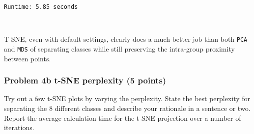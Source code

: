 \documentclass[11pt]{article}
\begin{document}
    \begin{Verbatim}[commandchars=\\\{\}]
Runtime: 5.85 seconds

    \end{Verbatim}

    \begin{center}
    \end{center}
    { \hspace*{\fill} \\}
    
    T-SNE, even with default settings, clearly does a much better job than
both \texttt{PCA} and \texttt{MDS} of separating classes while still
preserving the intra-group proximity between points.

    \subsubsection{Problem 4b t-SNE perplexity (5
points)}\label{problem-4b-t-sne-perplexity-5-points}

Try out a few t-SNE plots by varying the perplexity. State the best
perplexity for separating the 8 different classes and describe your
rationale in a sentence or two. Report the average calculation time for
the t-SNE projection over a number of iterations.
\end{document}
